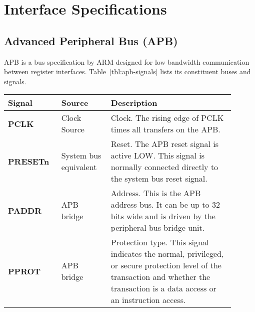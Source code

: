 \chapter{Interface Specifications}
\label{app:interfaces}

\section{Advanced Peripheral Bus (APB)}

APB is a bus specification by ARM designed for low bandwidth communication between register interfaces.
Table~\ref{tbl:apb-signals} lists its constituent buses and signals.

\begin{table}
    \begin{tabular}{p{0.2\linewidth}|p{0.2\linewidth}|p{0.5\linewidth}}
    \hline
    Signal   & Source                 & Description                                                                                                                                                                                                                                                                       \\ \hline
    \textbf{PCLK}     & Clock Source           & Clock. The rising edge of PCLK times all transfers on the APB.                                                                                                                                                                                                                    \\ \hline
    \textbf{PRESETn}  & System bus equivalent  & Reset. The APB reset signal is active LOW. This signal is normally connected directly to the system bus reset signal.                                                                                                                                                            \\ \hline
    \textbf{PADDR}    & APB bridge             & Address. This is the APB address bus. It can be up to 32 bits wide and is driven by the peripheral bus bridge unit.                                                                                                                                                               \\ \hline
    \textbf{PPROT}    & APB bridge             & Protection type. This signal indicates the normal, privileged, or secure protection level of the transaction and whether the transaction is a data access or an instruction access.                                                                                               \\ \hline

\end{tabular}
\end{table}
